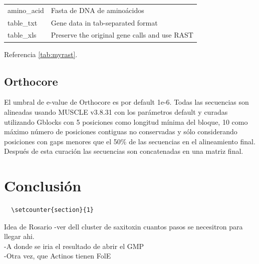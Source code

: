 \documentclass[12pt,twoside]{reedthesis}
\begin{document}
{\begin{longtable}[]{@{}ll@{}}
  \begin{minipage}[t]{0.22\columnwidth}\raggedright\strut
  amino\_acid\strut
  \end{minipage} & \begin{minipage}[t]{0.72\columnwidth}\raggedright\strut
  Fasta de DNA de aminoácidos\strut
  \end{minipage}\tabularnewline
  \begin{minipage}[t]{0.22\columnwidth}\raggedright\strut
  table\_txt\strut
  \end{minipage} & \begin{minipage}[t]{0.72\columnwidth}\raggedright\strut
  Gene data in tab-separated format\strut
  \end{minipage}\tabularnewline
  \begin{minipage}[t]{0.22\columnwidth}\raggedright\strut
  table\_xls\strut
  \end{minipage} & \begin{minipage}[t]{0.72\columnwidth}\raggedright\strut
  Preserve the original gene calls and use RAST\strut
  \end{minipage}\tabularnewline
  \bottomrule
  \end{longtable}
  
  Referencia \autoref{tab:myrast}.
  
  \section{Orthocore}\label{orthocore}
  
  El umbral de e-value de Orthocore es por default 1e-6. Todas las
  secuencias son alineadas usando MUSCLE v3.8.31 con los parámetros
  default y curadas utilizando Gblocks con 5 posiciones como longitud
  mínima del bloque, 10 como máximo número de posiciones contiguas no
  conservadas y sólo considerando posiciones con gaps menores que el 50\%
  de las secuencias en el alineamiento final. Después de esta curación las
  secuencias son concatenadas en una matriz final.
  
  \chapter{Conclusión}\label{conclusion}
  
  \begin{verbatim}
  \setcounter{section}{1}
  \end{verbatim}
  
  Idea de Rosario -ver dell cluster de saxitoxin cuantos pasos se
  necesitron para llegar ahi.\\
  -A donde se iria el resultado de abrir el GMP\\
  -Otra vez, que Actinos tienen FolE
  
}
\end{document}
